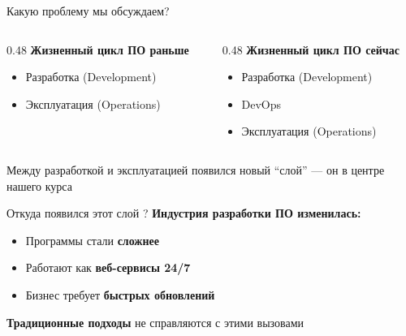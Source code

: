 \documentclass[aspectratio=169]{beamer}
\begin{document}

    \begin{frame}{Какую проблему мы обсуждаем?}
        \begin{columns}[t]

            \begin{column}[t]{0.48\textwidth}
                \textbf{Жизненный цикл ПО раньше}
                \begin{itemize}
                    \item Разработка (Development)
                    \item Эксплуатация (Operations)
                \end{itemize}
            \end{column}

            \begin{column}[t]{0.48\textwidth}
                \textbf{Жизненный цикл ПО сейчас}
                \begin{itemize}
                    \item Разработка (Development)
                    \item DevOps
                    \item Эксплуатация (Operations)
                \end{itemize}
            \end{column}

        \end{columns}

        \vspace{0.8cm}

        Между разработкой и эксплуатацией появился новый \enquote{слой} — он в центре нашего курса
    \end{frame}

    \begin{frame}{Откуда появился этот слой ?}
        \textbf{Индустрия разработки ПО изменилась:}
        \begin{itemize}
        \item Программы стали \textbf{сложнее}
        \item Работают как \textbf{веб-сервисы 24/7}
        \item Бизнес требует \textbf{быстрых обновлений}
        \end{itemize}

        \vspace{0.5cm}

        \textbf{Традиционные подходы} не справляются с этими вызовами
    \end{frame}
\end{document}
